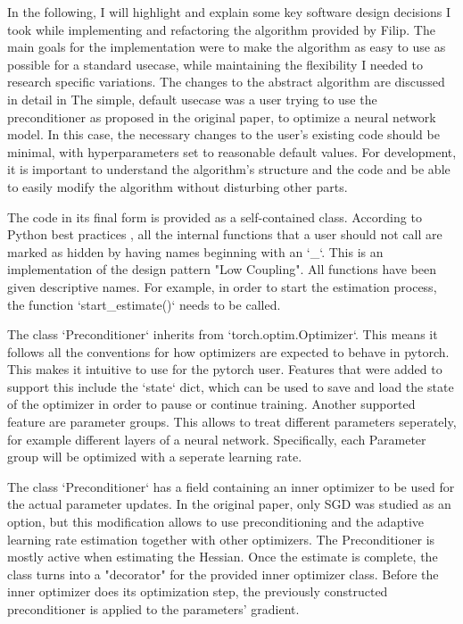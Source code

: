 \documentclass[twoside,12pt,a4paper]{report}
\begin{document}
\begin{markdown}
In the following, I will highlight and explain some key software design decisions I took while implementing and refactoring the algorithm provided by Filip.
The main goals for the implementation were to make the algorithm as easy to use as possible for a standard usecase, while maintaining the flexibility I needed to research specific variations. The changes to the abstract algorithm are discussed in detail in  The simple, default usecase was a user trying to use the preconditioner as proposed in the original paper, to optimize a neural network model. In this case, the necessary changes to the user's existing code should be minimal, with hyperparameters set to reasonable default values. For development, it is important to understand the algorithm's structure and the code and be able to easily modify the algorithm without disturbing other parts.

The code in its final form is provided as a self-contained class. According to Python best practices , all the internal functions that a user should not call are marked as hidden by having names beginning with an `_`. This is an implementation of the design pattern "Low Coupling". All functions have been given descriptive names. For example, in order to start the estimation process, the function `start_estimate()` needs to be called.

The class `Preconditioner` inherits from `torch.optim.Optimizer`. This means it follows all the conventions for how optimizers are expected to behave in pytorch. This makes it intuitive to use for the pytorch user. Features that were added to support this include the `state` dict, which can be used to save and load the state of the optimizer in order to pause or continue training. Another supported feature are parameter groups. This allows to treat different parameters seperately, for example different layers of a neural network. Specifically, each Parameter group will be optimized with a seperate learning rate.

The class `Preconditioner` has a field containing an inner optimizer to be used for the actual parameter updates. In the original paper, only SGD was studied as an option, but this modification allows to use preconditioning and the adaptive learning rate estimation together with other optimizers. The Preconditioner is mostly active when estimating the Hessian. Once the estimate is complete, the class turns into a "decorator" for the provided inner optimizer class. Before the inner optimizer does its optimization step, the previously constructed preconditioner is applied to the parameters' gradient.


\end{markdown}
\end{document}
